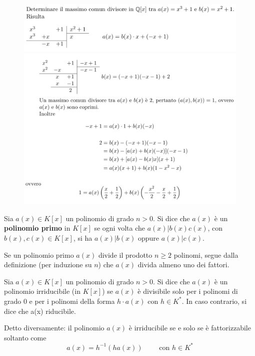 \documentclass[a4paper,12pt, oneside]{book}
\begin{document}
\begin{shaded}
	\begin{esempio}
	\end{esempio}
	\begin{figure}[H]
		\includegraphics[width=\linewidth,scale=1]{polydiv2}
		\includegraphics[width=\linewidth,scale=1]{polydiv3}
	\end{figure}
\end{shaded}

\begin{definizione}
	Sia $a(x) \in K[x]$ un polinomio di grado $n > 0$. Si dice che $a(x)$ è un \textbf{polinomio primo} in $K[x]$ se ogni volta che $a(x) | b(x)c(x)$, con $b(x),c(x) \in K[x]$, si ha $a(x) | b(x)$ oppure $a(x) | c(x)$.
\end{definizione}

\begin{osservazione}
	Se un polinomio primo $a(x)$ divide il prodotto $n \geq 2$ polinomi, segue dalla definizione (per induzione su $n$) che $a(x)$ divida almeno uno dei fattori.
\end{osservazione}

\begin{definizione}
	Sia $a(x) \in K[x]$ un polinomio di grado $n>0$. Si dice che $a(x)$ è un polinomio irriducibile (in $K[x]$) se $a(x)$ è divisibile solo per i polinomi di grado $0$ e per i polinomi della forma $h \cdot a(x)$ con $h \in K^{*}$. In caso contrario, si dice che a(x) riducibile.

	Detto diversamente: il polinomio $a(x)$ è irriducibile se e solo se è fattorizzabile soltanto come
	$$a(x) = h^{-1}(ha(x)) \qquad \mbox{ con } h \in K^{*}$$
\end{definizione}
\end{document}
